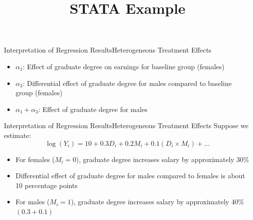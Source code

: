 \documentclass[dvipsnames,hyperref={pdfpagelabels=false}]{beamer}
\begin{document}
\begin{frame}{Interpretation of Regression Results}{Heterogeneous Treatment Effects}
	\begin{itemize}
		\item $\alpha_1$: Effect of graduate degree on earnings for baseline group (females)
		\vspace{0.2cm}
		\item $\alpha_3$: Differential effect of graduate degree for males compared to baseline group (females)
		\vspace{0.2cm}
		\item $\alpha_1 + \alpha_3$: Effect of graduate degree for males
	\end{itemize}
\end{frame}

\begin{frame}{Interpretation of Regression Results}{Heterogeneous Treatment Effects}
	Suppose we estimate:
	\vspace{0.2cm}
	\begin{equation*}
		\log(Y_i) = 10 + 0.3D_i + 0.2M_i + 0.1(D_i \times M_i) + \ldots
	\end{equation*}
	\begin{itemize}
		\item For females ($M_i = 0$), graduate degree increases salary by approximately 30\%
			\vspace{0.2cm}
		\item  Differential effect of graduate degree for males compared to females is about 10 percentage points
			\vspace{0.2cm}
		\item For males ($M_i = 1$), graduate degree increases salary by approximately 40\% $(0.3 + 0.1)$

	\end{itemize}
\end{frame}


\title[]  
{STATA Example}


\author 
{}

\institute{}
\end{document}
